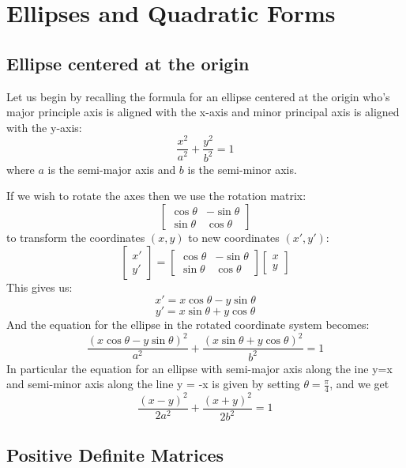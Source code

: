 \documentclass{article}
\begin{document}
\section*{Ellipses and Quadratic Forms}

\subsection{Ellipse centered at the origin}

Let us begin by recalling the formula for an ellipse centered at the origin who's major principle axis is aligned with the x-axis and minor principal axis is aligned with the y-axis:
\[\frac{x^2}{a^2} + \frac{y^2}{b^2} = 1\]
where \(a\) is the semi-major axis and \(b\) is the semi-minor axis.

If we wish to rotate the axes then we use the rotation matrix:
\[\begin{bmatrix}
\cos \theta & -\sin \theta \\
\sin \theta & \cos \theta
\end{bmatrix}\]
to transform the coordinates \((x, y)\) to new coordinates \((x', y')\):
\[\begin{bmatrix}
x' \\
y'
\end{bmatrix} = \begin{bmatrix}
\cos \theta & -\sin \theta \\
\sin \theta & \cos \theta
\end{bmatrix} \begin{bmatrix}
x \\
y
\end{bmatrix}\]
This gives us:
\[x' = x \cos \theta - y \sin \theta\]
\[y' = x \sin \theta + y \cos \theta\]
And the equation for the ellipse in the rotated coordinate system becomes:
\[\frac{(x \cos \theta - y \sin \theta)^2}{a^2} + \frac{(x \sin \theta + y \cos \theta)^2}{b^2} = 1\]   
In particular the equation for an ellipse with semi-major axis along the ine y=x and semi-minor axis along the line y = -x is given by setting \(\theta = \frac{\pi}{4}\), and we get
\[\frac{(x - y)^2}{2a^2} + \frac{(x + y)^2}{2b^2} = 1\]

\subsection{Positive Definite Matrices}
\end{document}

